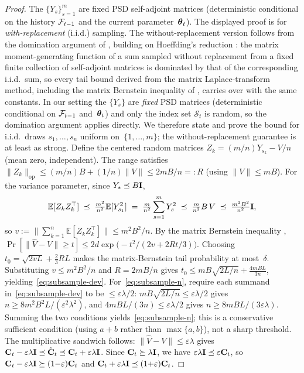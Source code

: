 \begin{proof}
The $\{Y_s\}_{s=1}^m$ are fixed PSD self-adjoint matrices (deterministic
conditional on the history $\mathcal{F}_{t-1}$ and the current
parameter~$\boldsymbol{\theta}_t$).
The displayed proof is for \emph{with-replacement} (i.i.d.) sampling.
The without-replacement version follows from the domination argument of
\citet{gross2010note}, building on Hoeffding's reduction
\citep{hoeffding1963probability}: the matrix moment-generating function
of a sum sampled without replacement from a fixed finite collection of
self-adjoint matrices is dominated by that of the corresponding
i.i.d.\ sum, so every tail bound derived from the matrix
Laplace-transform method, including the matrix Bernstein inequality of
\citet[Thm.~6.1.1]{tropp2015introduction}, carries over with the same
constants.
In our setting the $\{Y_s\}$ are \emph{fixed} PSD matrices
(deterministic conditional on $\mathcal{F}_{t-1}$ and~$\boldsymbol{\theta}_t$) and only
the index set $\mathcal{S}_t$ is random, so the domination argument
applies directly.
We therefore state and prove the bound for i.i.d.\ draws
$s_1,\dots,s_n$ uniform on~$\{1,\dots,m\}$; the
without-replacement guarantee is at least as strong.
Define the centered random matrices
$Z_k = (m/n)Y_{s_k} - V/n$ (mean zero, independent).
The range satisfies
$\|Z_k\|_{\mathrm{op}} \le (m/n)B + (1/n)\|V\| \le 2mB/n =: R$
(using $\|V\|\le mB$).
For the variance parameter, since $Y_s\preceq B\mathbf{I}$,
\[
  \mathbb{E}[Z_k Z_k^\top]
  \;\preceq\; \tfrac{m^2}{n^2}\mathbb{E}[Y_{s_1}^2]
  \;=\; \tfrac{m}{n^2}\sum_{s=1}^m Y_s^2
  \;\preceq\; \tfrac{m}{n^2}B\,V
  \;\preceq\; \tfrac{m^2B^2}{n^2}\mathbf{I},
\]
so $v :=
\bigl\|\sum_{k=1}^n\mathbb{E}[Z_kZ_k^\top]\bigr\|\le m^2B^2/n$.
By the matrix Bernstein inequality
\citep[Thm.~6.1.1]{tropp2015introduction},
$\Pr[\|\hat V{-}V\| \ge t]
\le 2d\exp\!\bigl(-t^2/(2v + 2Rt/3)\bigr)$.
Choosing
$t_0=\sqrt{2vL}+\tfrac{2}{3}RL$
makes the matrix-Bernstein tail probability at most~$\delta$.  Substituting
$v\le m^2B^2/n$ and $R=2mB/n$ gives
$t_0\le mB\sqrt{2L/n}+\tfrac{4mBL}{3n}$,
yielding~\eqref{eq:subsample-dev}.
For~\eqref{eq:subsample-n}, require each summand
in~\eqref{eq:subsample-dev} to be $\le\varepsilon\lambda/2$:
$mB\sqrt{2L/n}\le\varepsilon\lambda/2$ gives
$n\ge 8m^2B^2L/(\varepsilon^2\lambda^2)$, and
$4mBL/(3n)\le\varepsilon\lambda/2$ gives
$n\ge 8mBL/(3\varepsilon\lambda)$.
Summing the two conditions
yields~\eqref{eq:subsample-n}; this is a conservative sufficient
condition (using $a+b$ rather than $\max\{a,b\}$), not a sharp threshold.
The multiplicative sandwich follows:
$\|\hat V{-}V\|\le\varepsilon\lambda$ gives
$\mathbf{C}_t - \varepsilon\lambda\mathbf{I} \preceq \hat{\mathbf{C}}_t \preceq
\mathbf{C}_t + \varepsilon\lambda\mathbf{I}$.
Since $\mathbf{C}_t\succeq\lambda\mathbf{I}$, we have
$\varepsilon\lambda\mathbf{I} \preceq \varepsilon\mathbf{C}_t$, so
$\mathbf{C}_t - \varepsilon\lambda\mathbf{I} \succeq (1{-}\varepsilon)\mathbf{C}_t$ and
$\mathbf{C}_t + \varepsilon\lambda\mathbf{I} \preceq (1{+}\varepsilon)\mathbf{C}_t$.
\end{proof}

